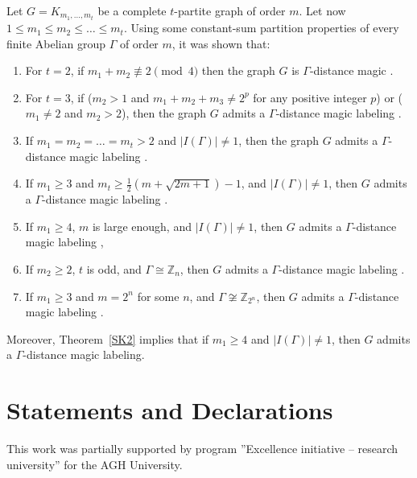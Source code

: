 \documentclass{article}
\newcommand{\zet}{\mathbb{Z}}
\begin{document}
Let $G=K_{m_1,\ldots,m_t}$ be a complete $t$-partite graph of order $m$. Let now $1\leq m_1\leq m_2 \leq\ldots\leq m_t$. Using some constant-sum partition properties of every finite Abelian group $\Gamma$ of order $m$, it was shown that:
\begin{enumerate}
\item  For $t=2$, if  $m_1 + m_2\not\equiv 2\pmod 4$ then the graph $G$ is  $\Gamma$-distance magic \cite{CichaczOM}.
	\item  For $t=3$, if ($m_2>1$ and  $m_1 + m_2+m_3\neq 2^p$ for any positive integer $p$) or  ($m_1\neq 2$ and $m_2>2$), then the graph $G$ admits a $\Gamma$-distance magic labeling \cite{Cic3}.
	\item If $m_1=m_2=\ldots=m_t>2$ and $|I(\Gamma)|\neq 1$, then the graph $G$ admits a $\Gamma$-distance magic labeling \cite{CicZ}.
	\item If $m_1\geq 3$ and $m_t\geq \frac{1}{2}(m +\sqrt{2m+1}) -1$, and $|I(\Gamma)|\neq 1$, then\/ $G$ admits a $\Gamma$-distance magic labeling \cite{CicTuz}.	
	\item  If $m_1\geq 4$, $m$ is large enough, and $|I(\Gamma)|\neq 1$, then\/ $G$ admits a $\Gamma$-distance magic labeling \cite{CicTuz},
	\item If $m_2\geq 2$, $t$ is odd, and $\Gamma\cong\zet_n$, then\/ $G$ admits a $\Gamma$-distance magic labeling \cite{FREYBERG2019}.
 	\item If $m_1\geq 3$ and $m=2^n$ for some $n$, and $\Gamma\not\cong \zet_{2^n}$, then\/ $G$ admits a $\Gamma$-distance magic labeling \cite{CicrSuch}.
\end{enumerate}
Moreover, Theorem~\ref{SK2} implies that if $m_1\geq 4$ and $|I(\Gamma)|\neq 1$, then\/ $G$ admits a $\Gamma$-distance magic labeling. 



\section{Statements and Declarations}
This work was partially  supported by program ''Excellence initiative – research university'' for the AGH University.



\end{document}
